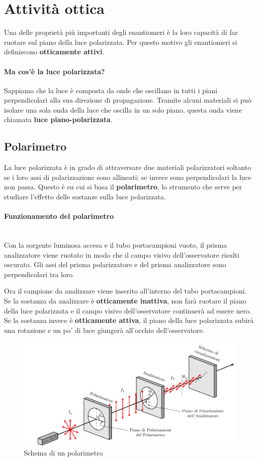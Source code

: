 \section{Attività ottica}
Una delle proprietà più importanti degli enantiomeri è la loro capacità di far ruotare sul piano della luce polarizzata. Per questo motivo gli enantiomeri si definiscono \textbf{otticamente attivi}.

\paragraph{Ma cos'è la luce polarizzata?} Sappiamo che la luce è composta da onde che oscillano in tutti i piani perpendicolari alla sua direzione di propagazione. Tramite alcuni materiali si può isolare una sola onda della luce che oscilla in un solo piano, questa onda viene chiamata \textbf{luce piano-polarizzata}.

\subsection{Polarimetro}
La luce polarizzata è in grado di attraversare due materiali polarizzatori soltanto se i loro assi di polarizzazione sono allineati; se invece sono perpendicolari la luce non passa. Questo è su cui si basa il \textbf{polarimetro}, lo strumento che serve per studiare l'effetto delle sostanze sulla luce polarizzata.

\paragraph{Funzionamento del polarimetro}\mbox{}\\
Con la sorgente luminosa accesa e il tubo portacampioni vuoto, il prisma analizzatore viene ruotato in modo che il campo visivo dell'osservatore risulti oscurato. Gli assi del prisma polarizzatore e del prisma analizzatore sono perpendicolari tra loro.

Ora il campione da analizzare viene inserito all'interno del tubo portacampioni. Se la sostanza da analizzare è \textbf{otticamente inattiva}, non farà ruotare il piano della luce polarizzata e il campo visivo dell'osservatore continuerà ad essere nero.
Se la sostanza invece è \textbf{otticamente attiva}, il piano della luce polarizzata subirà una rotazione e un po' di luce giungerà all'occhio dell'osservatore.

\begin{figure}[htp]
	\centering
	\includegraphics{Capitoli/Stereoisomeria/grafici/polarimetro.pdf}
	\caption{Schema di un polarimetro}
\end{figure}


